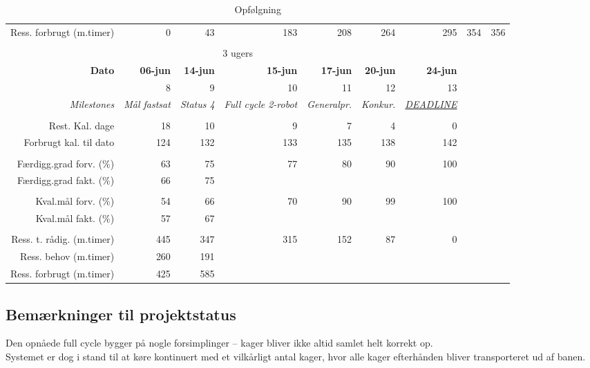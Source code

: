 \begin{sidewaystable}[!htbp]
\begin{footnotesize}
\begin{tabular}{r|rrrrrrrr}
    Ress. forbrugt (m.timer) & 0     & 43    & 183   & 208   & 264   & 295   & 354   & 356 \\%
%
%
\\
 & \multicolumn{4}{c}{3 ugers} \\ \hline
    \textbf{Dato} & \textbf{06-jun} & \textbf{14-jun} & \textbf{15-jun} & \textbf{17-jun} & \textbf{20-jun} & \textbf{24-jun} \\
 &       8     & 9     & 10    & 11  & 12 & 13\\
    \textit{Milestones} & \multicolumn{1}{c}{\textit{Mål fastsat}} & \multicolumn{1}{c}{\textit{Status 4}} & \multicolumn{1}{c}{\textit{Full cycle 2-robot}} & \multicolumn{1}{c}{\textit{Generalpr.}} & \multicolumn{1}{c}{\textit{Konkur.}} & \multicolumn{1}{c}{\textit{\underline{DEADLINE}}} \\
 & & & & & \\
    Rest. Kal. dage & 18 & 10 & 9   & 7     & 4     & 0 \\
    Forbrugt kal. til dato & 124 & 132 & 133   & 135   & 138   & 142 \\
 &       &       &     &  & & \\
    Færdigg.grad forv. (\%) & 63 & 75 & 77    & 80    & 90   & 100 \\
    Færdigg.grad fakt. (\%) & 66 & 75 &  &      &       & \\
 &       &       &       & & \\
    Kval.mål forv. (\%) & 54    & 66 & 70  & 90    & 99  & 100 \\
    Kval.mål fakt. (\%) & 57    & 67 &    &       &     & \\
 &       &       &     &  &  & \\
    Ress. t. rådig. (m.timer) & 445  & 347 & 315   & 152   & 87    & 0 \\
    Ress. behov (m.timer) & 260 & 191 & &       &       & \\
    Ress. forbrugt (m.timer) & 425 & 585 &  &       &       &
    \end{tabular}%
\end{footnotesize}
\caption{Opfølgning}\label{tab:opfolgning}
\end{sidewaystable}

\subsection{Bemærkninger til projektstatus}
Den opnåede full cycle bygger på nogle forsimplinger -- kager bliver ikke altid samlet helt korrekt op.\\
Systemet er dog i stand til at køre kontinuert med et vilkårligt antal kager, hvor alle kager efterhånden bliver transporteret ud af banen.